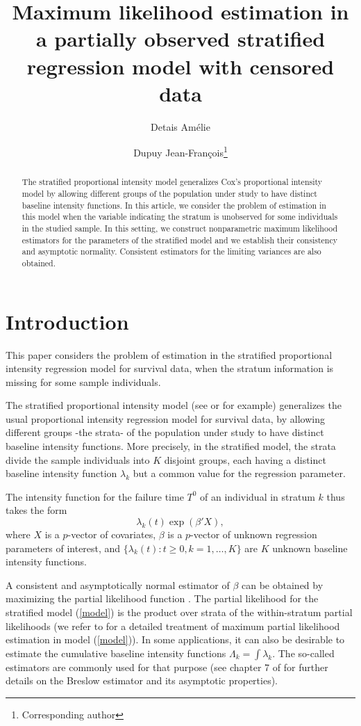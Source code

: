 \documentclass{statsoc}
\title[]{Maximum likelihood estimation in a partially observed stratified regression model with censored data}
\author[A. Detais, J.-F. Dupuy]{Detais Am\'elie}
\author[A. Detais, J.-F. Dupuy]{Dupuy Jean-Fran\c cois\footnote{Corresponding author}}
\begin{document}
\begin{abstract}
The stratified proportional intensity model generalizes Cox's proportional intensity model by allowing different groups of the population under study to have distinct baseline intensity functions. In this article, we consider the problem of estimation in this model when the variable indicating the stratum is unobserved for some individuals in the studied sample. In this setting, we construct  nonparametric maximum likelihood estimators for the parameters of the stratified model and we establish their consistency and asymptotic normality. Consistent estimators for the limiting variances are also obtained.
\end{abstract}

\section{Introduction}
This paper considers the problem of estimation in the stratified proportional intensity regression model for survival data, when the stratum information is missing for some sample individuals.

The stratified proportional intensity model (see \cite{and93} or \cite{mart06} for example) generalizes the usual \cite{cox72} proportional intensity regression model for survival data, by allowing different groups -the strata- of the population under study to have distinct baseline intensity functions. More precisely, in the stratified model, the strata divide the sample individuals into $K$ disjoint groups, each having a distinct baseline intensity function $\lambda_k$ but a common value for the regression parameter.

The intensity function for the failure time $T^0$ of an individual in stratum $k$ thus takes the form
\begin{equation}\label{model}
\lambda_k(t)\exp(\beta'X),
\end{equation}
where $X$ is a $p$-vector of covariates, $\beta$ is a $p$-vector of unknown regression parameters of interest, and $\{\lambda_k(t):t\geq 0, k=1,\ldots,K\}$ are $K$ unknown baseline intensity functions.

A consistent and asymptotically normal estimator of $\beta$ can be obtained by maximizing the partial likelihood function \citep{cox75}. The partial likelihood for the stratified model (\ref{model}) is the product over strata of the within-stratum partial likelihoods (we refer to \cite{and93} for a detailed treatment of maximum partial likelihood estimation in model (\ref{model})). In some applications, it can also be desirable to estimate the cumulative baseline intensity functions $\Lambda_k= \int \lambda_k$. The so-called \cite{bres72} estimators are commonly used for that purpose (see chapter 7 of \cite{and93} for further details on the Breslow estimator and its asymptotic properties).
\end{document}
